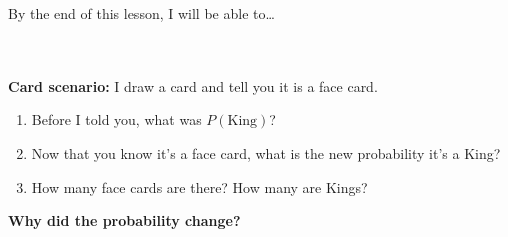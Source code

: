 \documentclass[10pt]{article}
\begin{document}
\namedateperiod

\vspace{0.12in}

\begin{objectivebox}
\small By the end of this lesson, I will be able to\dots\\[4pt]
\writeline\\[1pt]
\writeline\\[1pt]
\writeline
\end{objectivebox}

\vspace{0.1in}

\begin{vocabbox}
\end{vocabbox}

\vspace{0.1in}

\begin{hookbox}
\small
\textbf{Card scenario:} I draw a card and tell you it is a face card.
\begin{enumerate}[leftmargin=1.5em, itemsep=4pt]
  \item Before I told you, what was $P(\text{King})$? \blank{4cm}
  \item Now that you know it's a face card, what is the new probability it's a King?
        \blank{4cm}
  \item How many face cards are there? \blank{2cm} \quad How many are Kings? \blank{2cm}
\end{enumerate}
\textbf{Why did the probability change?}\\[4pt]
\writeline
\end{hookbox}

\vspace{0.1in}
\end{document}
